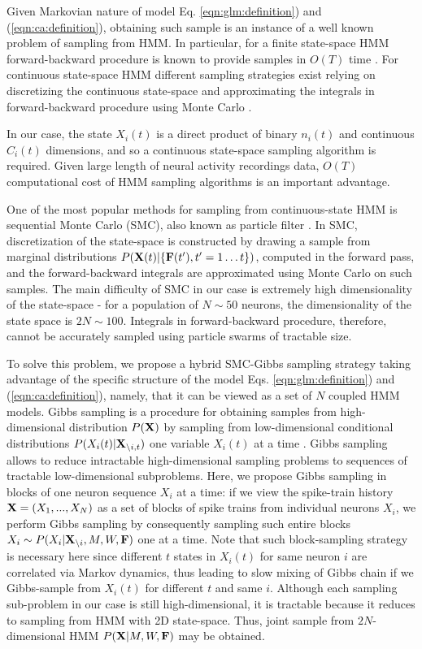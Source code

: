 Given Markovian nature of model Eq. \eqref{eqn:glm:definition}) and (\ref{eqn:ca:definition}), obtaining such sample is an instance of a well known problem of sampling from HMM. In particular, for a finite state-space HMM forward-backward procedure is known to provide samples in  $O(T)$ time \cite{RAB89}. For continuous state-space HMM different sampling strategies exist relying on discretizing the continuous state-space and approximating the integrals in forward-backward procedure using Monte Carlo \cite{DFG01, MINKAPHD, Fearnhead2003, koyama08, Andrieu2007, NBR03}.

In our case, the state $X_i(t)$ is a direct product of binary $n_i(t)$ and continuous $C_i(t)$ dimensions, and so a continuous state-space sampling algorithm is required.
Given large length of neural activity recordings data, $O(T)$ computational cost of HMM sampling algorithms is an important advantage.

One of the most popular methods for sampling from continuous-state HMM is sequential Monte Carlo (SMC), also known as particle filter \cite{DFG01}. In SMC, discretization of the state-space is constructed by drawing a sample from marginal distributions  $P({\bf X}(t)|\{{\bf F}(t'), t'=1\ldots t\})$, computed in the forward pass, and the forward-backward integrals are approximated using Monte Carlo on such samples. The main difficulty of SMC in our case is extremely high dimensionality of the state-space - for a population of $N\sim 50$ neurons, the dimensionality of the state space is $2N\sim 100$. Integrals in forward-backward procedure, therefore, cannot be accurately sampled using particle swarms of tractable size.

To solve this problem, we propose a hybrid SMC-Gibbs sampling strategy taking advantage of the specific structure of the model Eqs. \eqref{eqn:glm:definition}) and (\ref{eqn:ca:definition}), namely, that it can be viewed as a set of $N$ coupled HMM models. Gibbs sampling is a procedure for obtaining samples from high-dimensional distribution $P({\bf X})$ by sampling from low-dimensional conditional distributions $P(X_{i}(t)|{\bf X}_{\backslash i, t})$ one variable $X_{i}(t)$ at a time \cite{Gelfand1990}.  Gibbs sampling allows to reduce intractable high-dimensional sampling problems to sequences of tractable low-dimensional subproblems.  Here, we propose Gibbs sampling in blocks of one neuron sequence $X_{i}$ at a time: if we view the spike-train history ${\bf X}=(X_1, ..., X_N)$ as a set of blocks of spike trains from individual neurons $X_i$, we perform Gibbs sampling by consequently sampling such entire blocks $X_i\sim P(X_{i}|{\bf X}_{\backslash i}, M, W, {\bf F})$ one at a time.  Note that such block-sampling strategy is necessary here since different $t$ states in $X_i(t)$ for same neuron $i$ are correlated via Markov dynamics, thus leading to slow mixing of Gibbs chain if we Gibbs-sample from $X_i(t)$ for different $t$ and same $i$.  Although each sampling sub-problem in our case is still high-dimensional, it is tractable because it reduces to sampling from HMM with 2D state-space. Thus, joint sample from $2N$-dimensional HMM $P({\bf X}|M, W, {\bf F})$ may be obtained.

